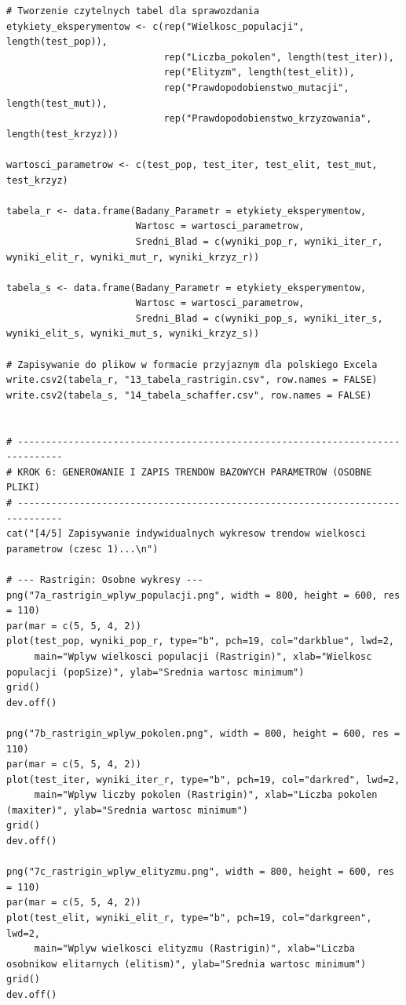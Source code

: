 \documentclass[a4paper,12pt]{article}
\begin{document}
\begin{lstlisting}
# Tworzenie czytelnych tabel dla sprawozdania
etykiety_eksperymentow <- c(rep("Wielkosc_populacji", length(test_pop)),
                            rep("Liczba_pokolen", length(test_iter)),
                            rep("Elityzm", length(test_elit)),
                            rep("Prawdopodobienstwo_mutacji", length(test_mut)),
                            rep("Prawdopodobienstwo_krzyzowania", length(test_krzyz)))

wartosci_parametrow <- c(test_pop, test_iter, test_elit, test_mut, test_krzyz)

tabela_r <- data.frame(Badany_Parametr = etykiety_eksperymentow, 
                       Wartosc = wartosci_parametrow, 
                       Sredni_Blad = c(wyniki_pop_r, wyniki_iter_r, wyniki_elit_r, wyniki_mut_r, wyniki_krzyz_r))

tabela_s <- data.frame(Badany_Parametr = etykiety_eksperymentow, 
                       Wartosc = wartosci_parametrow, 
                       Sredni_Blad = c(wyniki_pop_s, wyniki_iter_s, wyniki_elit_s, wyniki_mut_s, wyniki_krzyz_s))

# Zapisywanie do plikow w formacie przyjaznym dla polskiego Excela
write.csv2(tabela_r, "13_tabela_rastrigin.csv", row.names = FALSE)
write.csv2(tabela_s, "14_tabela_schaffer.csv", row.names = FALSE)


# ------------------------------------------------------------------------------
# KROK 6: GENEROWANIE I ZAPIS TRENDOW BAZOWYCH PARAMETROW (OSOBNE PLIKI)
# ------------------------------------------------------------------------------
cat("[4/5] Zapisywanie indywidualnych wykresow trendow wielkosci parametrow (czesc 1)...\n")

# --- Rastrigin: Osobne wykresy ---
png("7a_rastrigin_wplyw_populacji.png", width = 800, height = 600, res = 110)
par(mar = c(5, 5, 4, 2))
plot(test_pop, wyniki_pop_r, type="b", pch=19, col="darkblue", lwd=2, 
     main="Wplyw wielkosci populacji (Rastrigin)", xlab="Wielkosc populacji (popSize)", ylab="Srednia wartosc minimum")
grid()
dev.off()

png("7b_rastrigin_wplyw_pokolen.png", width = 800, height = 600, res = 110)
par(mar = c(5, 5, 4, 2))
plot(test_iter, wyniki_iter_r, type="b", pch=19, col="darkred", lwd=2, 
     main="Wplyw liczby pokolen (Rastrigin)", xlab="Liczba pokolen (maxiter)", ylab="Srednia wartosc minimum")
grid()
dev.off()

png("7c_rastrigin_wplyw_elityzmu.png", width = 800, height = 600, res = 110)
par(mar = c(5, 5, 4, 2))
plot(test_elit, wyniki_elit_r, type="b", pch=19, col="darkgreen", lwd=2, 
     main="Wplyw wielkosci elityzmu (Rastrigin)", xlab="Liczba osobnikow elitarnych (elitism)", ylab="Srednia wartosc minimum")
grid()
dev.off()


\end{lstlisting}
\end{document}

